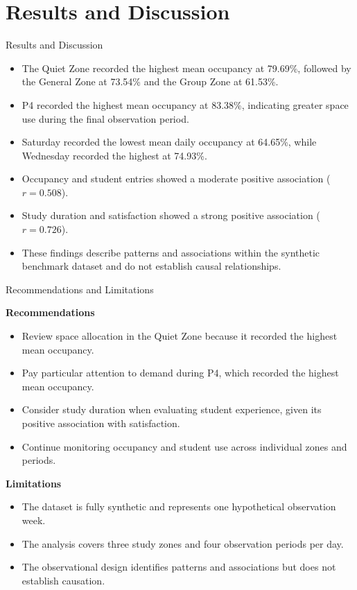 \documentclass[aspectratio=169,11pt]{beamer}
\begin{document}
\section{Results and Discussion}

\begin{frame}{Results and Discussion}
	\small
	\begin{itemize}
		\item The Quiet Zone recorded the highest mean occupancy at 79.69\%, followed by the General Zone at 73.54\% and the Group Zone at 61.53\%.
		
		\item P4 recorded the highest mean occupancy at 83.38\%, indicating greater space use during the final observation period.
		
		\item Saturday recorded the lowest mean daily occupancy at 64.65\%, while Wednesday recorded the highest at 74.93\%.
		
		\item Occupancy and student entries showed a moderate positive association ($r=0.508$).
		
		\item Study duration and satisfaction showed a strong positive association ($r=0.726$).
		
		\item These findings describe patterns and associations within the synthetic benchmark dataset and do not establish causal relationships.
	\end{itemize}
\end{frame}

\begin{frame}{Recommendations and Limitations}
	\small
	
	\textbf{Recommendations}
	\begin{itemize}
		\item Review space allocation in the Quiet Zone because it recorded the highest mean occupancy.
		\item Pay particular attention to demand during P4, which recorded the highest mean occupancy.
		\item Consider study duration when evaluating student experience, given its positive association with satisfaction.
		\item Continue monitoring occupancy and student use across individual zones and periods.
	\end{itemize}
	
	\vspace{0.15cm}
	
	\textbf{Limitations}
	\begin{itemize}
		\item The dataset is fully synthetic and represents one hypothetical observation week.
		\item The analysis covers three study zones and four observation periods per day.
		\item The observational design identifies patterns and associations but does not establish causation.
	\end{itemize}
	
\end{frame}
\end{document}
